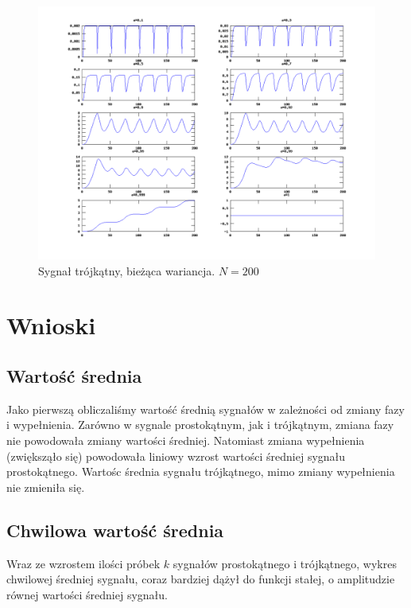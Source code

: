 \documentclass[wide,a4paper,titlepage,12pt]{mwart}
\begin{document}
      \begin{landscape}
        \begin{figure}[htbp]
          \begin{center}
            \includegraphics[scale=.5]{out/Figure11.png}
            \caption{\label{wykres11}Sygnał trójkątny, bieżąca wariancja. $N=200$}
          \end{center}
        \end{figure}
      \end{landscape}
      
        
  \section{Wnioski}
  \label{sec:Wnioski}
    \subsection{Wartość średnia}
    Jako pierwszą obliczaliśmy wartość średnią sygnałów w zależności od zmiany fazy i wypełnienia. Zarówno w sygnale prostokątnym, jak i trójkątnym, zmiana fazy nie powodowała zmiany wartości średniej. Natomiast zmiana wypełnienia (zwiększąło się) powodowała liniowy wzrost wartości średniej sygnału prostokątnego. Wartośc średnia sygnału trójkątnego, mimo zmiany wypełnienia nie zmieniła się. 

    \subsection{Chwilowa wartość średnia}
    Wraz ze wzrostem ilości próbek $k$ sygnałów prostokątnego i trójkątnego, wykres chwilowej średniej sygnału, coraz bardziej dążył do funkcji stałej, o amplitudzie równej wartości średniej sygnału.
\end{document}
